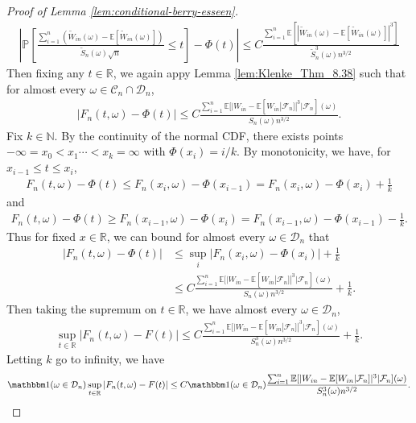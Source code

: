 \documentclass[12pt]{article}
\theoremstyle{definition}
\def\P{\mathbb{P}}
\def\P{\mathbb{P}}
\newcommand{\E}{\mathbb E}								%
\renewcommand{\P}{\mathbb{P}}							%
\newcommand{\indicator}{\mathbbm 1}						%
\begin{document}
\begin{proof}[Proof of Lemma \ref{lem:conditional-berry-esseen}]
		\begin{align*}
			\left|\P\left[\frac{\sum_{i=1}^n (\widetilde W_{in}(\omega)-\E[\widetilde W_{in}(\omega)])}{\widetilde S_n(\omega)\sqrt{n}}\leq t\right]-\Phi(t)\right|\leq C\frac{\sum_{i=1}^n \E[|\widetilde W_{in}(\omega)-\E[\widetilde W_{in}(\omega)]|^3]}{\widetilde S_n^3(\omega)n^{3/2}}
		\end{align*}
		Then fixing any $t\in\mathbb{R}$, we again appy Lemma \ref{lem:Klenke_Thm_8.38} such that for almost every $\omega\in\mathcal{C}_n\cap \mathcal{D}_n$,
		\begin{align*}
			|F_n(t,\omega)-\Phi(t)|\leq C\frac{\sum_{i=1}^n \E[|W_{in}-\E[W_{in}|\mathcal{F}_n]|^3|\mathcal{F}_n](\omega)}{S_n(\omega)n^{3/2}}.
		\end{align*}
		Fix $k\in\mathbb{N}$. By the continuity of the normal CDF, there exists points $-\infty=x_0<x_1\cdots<x_k=\infty$ with $\Phi(x_i)=i/k$. By monotonicity, we have, for $x_{i-1}\leq t\leq x_i$,
		\begin{align*}
			F_n(t,\omega)-\Phi(t)\leq F_n(x_i,\omega)-\Phi(x_{i-1})=F_n(x_i,\omega)-\Phi(x_i)+\frac{1}{k}
		\end{align*}
		and 
		\begin{align*}
			F_n(t,\omega)-\Phi(t)\geq F_n(x_{i-1},\omega)-\Phi(x_i)=F_n(x_{i-1},\omega)-\Phi(x_{i-1})-\frac{1}{k}.
		\end{align*}
		Thus for fixed $x\in\mathbb{R}$, we can bound for almost every $\omega\in\mathcal{D}_n$ that
		\begin{align*}
			|F_n(t,\omega)-\Phi(t)|
			&
			\leq \sup_{i}|F_n(x_i,\omega)-\Phi(x_{i})|+\frac{1}{k}\\
			&
			\leq C\frac{\sum_{i=1}^n \E[|W_{in}-\E[W_{in}|\mathcal{F}_n]|^3|\mathcal{F}_n](\omega)}{S_n(\omega)n^{3/2}}+\frac{1}{k}.
		\end{align*}
		Then taking the supremum on $t\in\mathbb{R}$, we have almost every $\omega\in\mathcal{D}_n$,
		\begin{align*}
			\sup_{t\in\mathbb{R}}|F_n(t,\omega)-F(t)|\leq C\frac{\sum_{i=1}^n \E[|W_{in}-\E[W_{in}|\mathcal{F}_n]|^3|\mathcal{F}_n](\omega)}{S_n^3(\omega)n^{3/2}}+\frac{1}{k}.
		\end{align*}
		Letting $k$ go to infinity, we have
		\begin{align}\label{eq:Berry_Esseen_bound_on_C_n}
			\indicator(\omega\in\mathcal{D}_n)\sup_{t\in\mathbb{R}}|F_n(t,\omega)-F(t)|\leq C\indicator(\omega\in\mathcal{D}_n)\frac{\sum_{i=1}^n \E[|W_{in}-\E[W_{in}|\mathcal{F}_n]|^3|\mathcal{F}_n](\omega)}{S_n^3(\omega)n^{3/2}}.

\end{align}
\end{proof}
\end{document}
